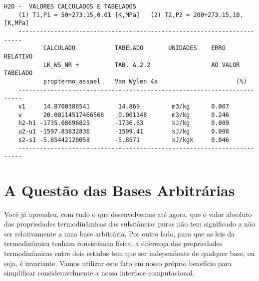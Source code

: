     \begin{Verbatim}[baselinestretch=1.0]
                 H2O -  VALORES CALCULADOS E TABELADOS
    (1) T1,P1 = 50+273.15,0.01 [K,MPa]   (2) T2,P2 = 200+273.15,10.  [K,MPa]
    -----------------------------------------------------------------------
           CALCULADO           TABELADO       UNIDADES    ERRO RELATIVO
           LK_WS_NR +          TAB. A.2.2                 AO VALOR TABELADO
           proptermo_assael    Van Wylen 4a                      (%)
    -----------------------------------------------------------------------
    v1     14.8700386541        14.869         m3/kg      0.007
    v      20.00114517466568    0.001148       m3/kg      0.246
    h2-h1 -1735.08696825       -1736.63        kJ/kg      0.089
    u2-u1 -1597.83832836       -1599.41        kJ/kg      0.098
    s2-s1 -5.85442128058       -5.8571         kJ/kgk     0.046
    -----------------------------------------------------------------------
    \end{Verbatim}

    \section{A Questão das Bases Arbitrárias}

    Você já aprendeu, com tudo o que desenvolvemos até agora, que o valor
    absoluto das propriedades termodinâmicas das substâncias puras não tem
    significado a não ser relativamente a uma base arbitrária. Por outro lado,
    para que as leis da termodinâmica tenham consistência física, a diferença
    das propriedades termodinâmicas entre dois estados tem que ser independente
    de qualquer base, ou seja, é invariante. Vamos utilizar este fato em nosso
    próprio benefício para simplificar consideravelmente a nossa interface
    computacional.

